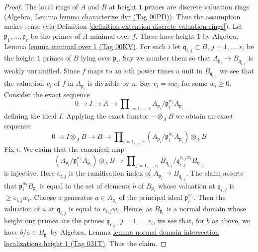 \documentclass{amsart}
\theoremstyle{plain}
\theoremstyle{definition}
\theoremstyle{remark}
\numberwithin{equation}{subsection}
\begin{document}
\begin{proof}
The local rings of $A$ and $B$ at height $1$ primes are
discrete valuation rings (Algebra, Lemma \href{https://stacks.math.columbia.edu/tag/00PD}{lemma characterize dvr (Tag 00PD)}).
Thus the assumption makes sense (via
Definition \ref{definition-extension-discrete-valuation-rings}).
Let $\mathfrak p_1, \ldots, \mathfrak p_r$ be the primes of $A$ minimal
over $f$. These have height $1$ by
Algebra, Lemma \href{https://stacks.math.columbia.edu/tag/00KV}{lemma minimal over 1 (Tag 00KV)}.
For each $i$ let $\mathfrak q_{i, j} \subset B$, $j = 1, \ldots, r_i$
be the height $1$ primes of $B$ lying over $\mathfrak p_i$.
Say we number them so that  $A_{\mathfrak p_i} \to B_{\mathfrak q_{i, 1}}$
is weakly unramified.
Since $f$ maps to an $n$th power times a unit in $B_{\mathfrak q_{i, 1}}$
we see that the valuation $v_i$ of $f$ in $A_{\mathfrak p_i}$ is
divisible by $n$. Say $v_i = n w_i$ for some $w_i \geq 0$.
Consider the exact sequence
$$
0 \to I \to A \to
\prod\nolimits_{i = 1, \ldots, r}
A_{\mathfrak p_i}/\mathfrak p_i^{w_i}A_{\mathfrak p_i}
$$
defining the ideal $I$. Applying the exact functor $- \otimes_A B$ we obtain
an exact sequence
$$
0 \to I \otimes_A B \to B \to
\prod\nolimits_{i = 1, \ldots, r}
(A_{\mathfrak p_i}/\mathfrak p_i^{w_i}A_{\mathfrak p_i}) \otimes_A B
$$
Fix $i$. We claim that the canonical map
$$
(A_{\mathfrak p_i}/\mathfrak p_i^{w_i}A_{\mathfrak p_i}) \otimes_A B
\to
\prod\nolimits_{j = 1, \ldots, r_i}
B_{\mathfrak q_{i, j}}/\mathfrak q_{i, j}^{e_{i, j}w_i}B_{\mathfrak q_{i, j}}
$$
is injective. Here $e_{i, j}$ is the ramification index of 
$A_{\mathfrak p_i} \to B_{\mathfrak q_{i, j}}$.
The claim asserts that $\mathfrak p_i^{w_i}B_{\mathfrak p_i}$
is equal to the set of elements $b$ of $B_{\mathfrak p_i}$
whose valuation at $\mathfrak q_{i, j}$ is $\geq e_{i, j}w_i$.
Choose a generator $a \in A_{\mathfrak p_i}$ of the principal
ideal $\mathfrak p_i^{w_i}$. Then the valuation of $a$ at
$\mathfrak q_{i, j}$ is equal to $e_{i, j}w_i$. Hence,
as $B_{\mathfrak p_i}$ is a normal domain whose height one
primes are the primes $\mathfrak q_{i, j}$, $j = 1, \ldots, r_i$,
we see that, for $b$ as above, we have $b/a \in B_{\mathfrak p_i}$ by
Algebra, Lemma
\href{https://stacks.math.columbia.edu/tag/031T}{lemma normal domain intersection localizations height 1 (Tag 031T)}.
Thus the claim.


\end{proof}
\end{document}
